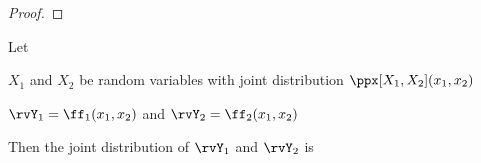 \begin{proof}
\end{proof}

\begin{theorem}
\label{thm:x1x2->y1y2}
Let
\begin{liste}
  \item $X_1$ and $X_2$ be random variables with joint distribution
        $\ppx[X_1,X_2](x_1,x_2)$
  \item $\rvY_1=\ff_1(x_1,x_2)$ and $\rvY_2=\ff_2(x_1,x_2)$
\end{liste}
Then the joint distribution of $\rvY_1$ and $\rvY_2$ is
\end{theorem}

